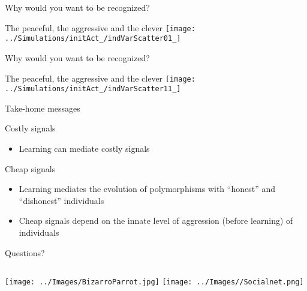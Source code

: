 \documentclass[
  ignorenonframetext,
  aspectratio=169]{beamer}
\providecommand{\tightlist}{%
  \setlength{\itemsep}{0pt}\setlength{\parskip}{0pt}}
\begin{document}
\begin{frame}{Why would you want to be recognized?}
\protect\hypertarget{why-would-you-want-to-be-recognized-1}{}
\begin{block}{The peaceful, the aggressive and the clever}
\protect\hypertarget{the-peaceful-the-aggressive-and-the-clever-1}{}
\texttt{[image: ../Simulations/initAct\_/indVarScatter01\_]}
\end{block}
\end{frame}

\begin{frame}{Why would you want to be recognized?}
\protect\hypertarget{why-would-you-want-to-be-recognized-2}{}
\begin{block}{The peaceful, the aggressive and the clever}
\protect\hypertarget{the-peaceful-the-aggressive-and-the-clever-2}{}
\texttt{[image: ../Simulations/initAct\_/indVarScatter11\_]}
\end{block}
\end{frame}

\begin{frame}{Take-home messages}
\protect\hypertarget{take-home-messages}{}
\begin{block}{Costly signals}
\protect\hypertarget{costly-signals}{}
\begin{itemize}
\tightlist
\item
  Learning can mediate costly signals
\end{itemize}
\end{block}

\begin{block}{Cheap signals}
\protect\hypertarget{cheap-signals}{}
\begin{itemize}
\tightlist
\item
  Learning mediates the evolution of polymorphisms with ``honest'' and
  ``dishonest'' individuals
\item
  Cheap signals depend on the innate level of aggression (before
  learning) of individuals
\end{itemize}
\end{block}
\end{frame}

\begin{frame}{Questions?}
\protect\hypertarget{questions}{}
\begin{columns}[T]
  \texttt{[image: ../Images/BizarroParrot.jpg]}
  \texttt{[image: ../Images//Socialnet.png]}
\end{columns}
\end{frame}
\end{document}
